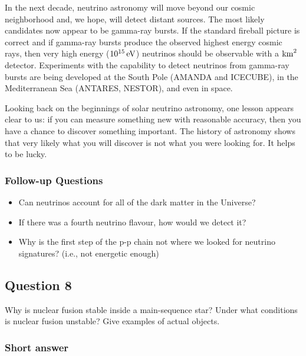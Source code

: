 \documentclass[a4paper,10pt]{article}
\begin{document}
{\noindent}In the next decade, neutrino astronomy will move beyond our cosmic neighborhood and, we hope, will detect distant sources. The most likely candidates now appear to be gamma-ray bursts. If the standard fireball picture is correct and if gamma-ray bursts produce the observed highest energy cosmic rays, then very high energy ($10^{15}\,{\rm eV}$) neutrinos should be observable with a ${\rm km}^2$ detector. Experiments with the capability to detect neutrinos from gamma-ray bursts are being developed at the South Pole (AMANDA and ICECUBE), in the Mediterranean Sea (ANTARES, NESTOR), and even in space.

{\noindent}Looking back on the beginnings of solar neutrino astronomy, one lesson appears clear to us: if you can measure something new with reasonable accuracy, then you have a chance to discover something important. The history of astronomy shows that very likely what you will discover is not what you were looking for. It helps to be lucky. 

\subsubsection{Follow-up Questions}

\begin{itemize}
    \item Can neutrinos account for all of the dark matter in the Universe?
    \item If there was a fourth neutrino flavour, how would we detect it?
    \item Why is the first step of the p-p chain not where we looked for neutrino signatures? (i.e., not energetic enough)
\end{itemize}


\newpage
\subsection{Question 8}

Why is nuclear fusion stable inside a main-sequence star? Under what conditions is nuclear fusion unstable? Give examples of actual objects.

\subsubsection{Short answer}
\end{document}
